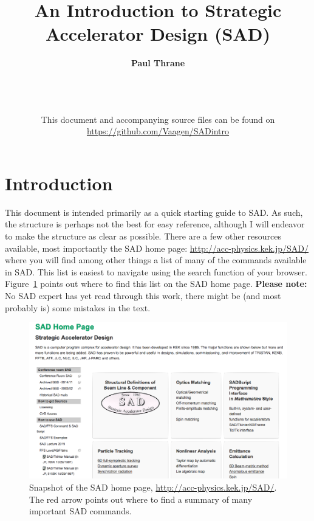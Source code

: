 \documentclass{article}
\title{\huge{An Introduction to Strategic Accelerator Design (SAD)}}
\author{\textbf{Paul Thrane}}
\date{
	\sadDate \\ \ \\ \ \\
	This document and accompanying source files can be found on\\
	\url{https://github.com/Vaagen/SADintro}}
\begin{document}
\maketitle



\newpage
\tableofcontents
\newpage


\section{Introduction}

This document is intended primarily as a quick starting guide to SAD. As such, the structure is perhaps not the best for easy reference, although I will endeavor to make the structure as clear as possible.
There are a few other resources available, most importantly the SAD home page: \url{http://acc-physics.kek.jp/SAD/} where you will find among other things a list of many of the commands available in SAD. This list is easiest to navigate using the search function of your browser. Figure~\ref{fig:sadHomePage} points out where to find this list on the SAD home page.
\textbf{Please note:} No SAD expert has yet read through this work, there might be (and most probably is) some mistakes in the text.

\begin{figure}[h]
	\begin{center}
	\includegraphics[width=0.75\columnwidth]{figures/sadHomePage.png}
	\end{center}
	\caption{Snapshot of the SAD home page, \url{http://acc-physics.kek.jp/SAD/}. The red arrow points out where to find a summary of many important SAD commands.}
	\label{fig:sadHomePage}
\end{figure}
\end{document}
